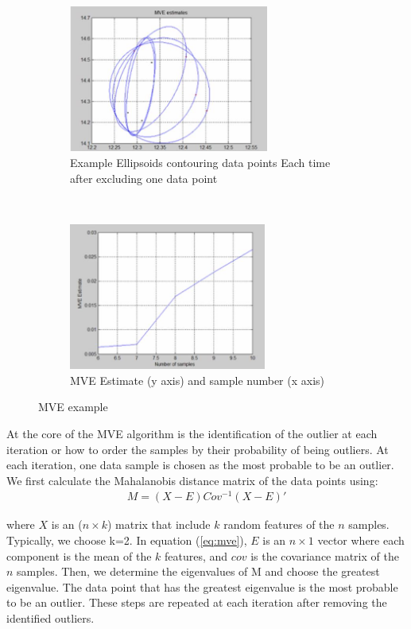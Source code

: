 \begin{figure}
	\centering
	\begin{subfigure}[b]{0.5\textwidth}
		\centering
		\includegraphics[height=1.9in]{MVEll.JPG}
		\caption{Example Ellipsoids contouring data points Each time after excluding one data point}
		\label{mve}
	\end{subfigure}%
	~ 
	\begin{subfigure}[b]{0.5\textwidth}
		\centering
		\includegraphics[height=1.9in]{MVEll2.JPG}
		\caption{MVE Estimate (y axis) and sample number (x axis)}
		\label{mve2}
	\end{subfigure}
	\caption{MVE example}
\end{figure}


At the core of the MVE algorithm is the identification of the outlier at each iteration or how to order the samples by their probability of being outliers.
At each iteration, one data sample is chosen as the most probable to be an outlier. We first calculate the Mahalanobis distance matrix of the data points using:
\begin{eqnarray}\label{eq:mve}
M= (X-E) Cov^{-1} (X-E)'
\end{eqnarray}

where $X$ is an ($n \times k$) matrix that include $k$ random features of the $n$ samples. Typically, we choose k=2. In equation (\ref{eq:mve}), $E$ is an $n \times 1$ vector where each component is the mean of the $k$ features, and $cov$ is the covariance matrix of the $n$ samples. Then, we determine the eigenvalues of M and choose the greatest eigenvalue. The data point that has the greatest eigenvalue is the most probable to be an outlier. These steps are repeated at each iteration after removing the identified outliers.

